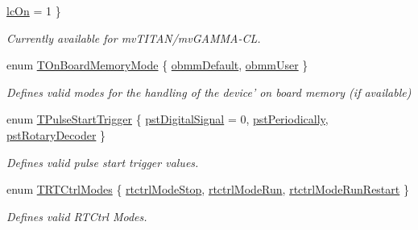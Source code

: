 \begin{DoxyCompactItemize}
\hyperlink{group___device_specific_interface_ggab9051a0d97eafeaff2951aa0196f14eba283c11769946008dea6ec3f69806a0af}{lc\+On} = 1
 \}
\begin{DoxyCompactList}\small\item\em Currently available for mv\+T\+I\+T\+A\+N/mv\+G\+A\+M\+M\+A-\/\+C\+L. \end{DoxyCompactList}\item 
enum \hyperlink{group___device_specific_interface_gafeb5475c72e0081fb102cb94b4c26a1b}{T\+On\+Board\+Memory\+Mode} \{ \hyperlink{group___device_specific_interface_ggafeb5475c72e0081fb102cb94b4c26a1ba4173a28c37fb43b94a91a69fb2b07bd8}{obmm\+Default}, 
\hyperlink{group___device_specific_interface_ggafeb5475c72e0081fb102cb94b4c26a1bae790fc73a6e85194fa95c0a9b1e6c486}{obmm\+User}
 \}
\begin{DoxyCompactList}\small\item\em Defines valid modes for the handling of the device' on board memory (if available) \end{DoxyCompactList}\item 
enum \hyperlink{group___device_specific_interface_gad2cb2c5b518e2428f7b81a3dafc5f0a0}{T\+Pulse\+Start\+Trigger} \{ \hyperlink{group___device_specific_interface_ggad2cb2c5b518e2428f7b81a3dafc5f0a0a6f800150795eb825b026708a3a80ecf3}{pst\+Digital\+Signal} = 0, 
\hyperlink{group___device_specific_interface_ggad2cb2c5b518e2428f7b81a3dafc5f0a0a94af79d0a1007cbf65296e07fb3513c4}{pst\+Periodically}, 
\hyperlink{group___device_specific_interface_ggad2cb2c5b518e2428f7b81a3dafc5f0a0a9ea1caa3fa97e38b94df03a27e7e93fb}{pst\+Rotary\+Decoder}
 \}
\begin{DoxyCompactList}\small\item\em Defines valid pulse start trigger values. \end{DoxyCompactList}\item 
enum \hyperlink{group___device_specific_interface_gaa8cbd8960bf75617dcd943de055a7a14}{T\+R\+T\+Ctrl\+Modes} \{ \hyperlink{group___device_specific_interface_ggaa8cbd8960bf75617dcd943de055a7a14a96df4ac6b3c55deb28058f64ad253494}{rtctrl\+Mode\+Stop}, 
\hyperlink{group___device_specific_interface_ggaa8cbd8960bf75617dcd943de055a7a14a05081a73cf59fc2de17b94cb514de5f8}{rtctrl\+Mode\+Run}, 
\hyperlink{group___device_specific_interface_ggaa8cbd8960bf75617dcd943de055a7a14aaade2e166b2c6f4b9fa2285dad1ecf77}{rtctrl\+Mode\+Run\+Restart}
 \}
\begin{DoxyCompactList}\small\item\em Defines valid R\+T\+Ctrl Modes. \end{DoxyCompactList}\item 

\end{DoxyCompactItemize}
